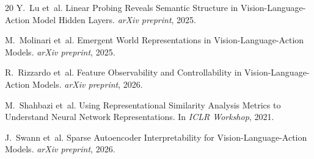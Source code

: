 \documentclass[letterpaper]{article}
\begin{document}
{\begin{thebibliography}{20}
Y.~Lu et~al.
\newblock Linear Probing Reveals Semantic Structure in Vision-Language-Action Model Hidden Layers.
\newblock \emph{arXiv preprint}, 2025.

M.~Molinari et~al.
\newblock Emergent World Representations in Vision-Language-Action Models.
\newblock \emph{arXiv preprint}, 2025.

R.~Rizzardo et~al.
\newblock Feature Observability and Controllability in Vision-Language-Action Models.
\newblock \emph{arXiv preprint}, 2026.

M.~Shahbazi et~al.
\newblock Using Representational Similarity Analysis Metrics to Understand Neural Network Representations.
\newblock In \emph{ICLR Workshop}, 2021.

J.~Swann et~al.
\newblock Sparse Autoencoder Interpretability for Vision-Language-Action Models.
\newblock \emph{arXiv preprint}, 2026.

\end{thebibliography}
}
\end{document}
